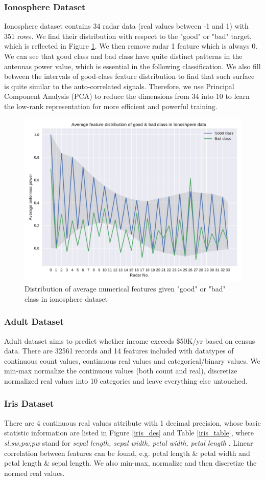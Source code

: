 \documentclass[11pt]{scrartcl}
\begin{document}
\subsubsection*{Ionosphere Dataset}
Ionosphere dataset contains 34 radar data (real values between -1 and 1) with 351 rows\cite{sigillito1989classification}. We find their distribution with respect to the "good" or "bad" target, which is reflected in Figure \ref{iono_feat}. We then remove radar 1 feature which is always 0. We can see that good class and bad class have quite distinct patterns in the antennas power value, which is essential in the following classification. We also fill between the intervals of good-class feature distribution to find that such surface is quite similar to the auto-correlated signals. Therefore, we use Principal Component Analysis (PCA) to reduce the dimensions from 34 into 10 to learn the low-rank representation for more efficient and powerful training.

\begin{figure}[t]
	\centering
	\includegraphics[width=0.6\linewidth]{fig/iono_feat_dist.pdf}
	\caption{Distribution of average numerical features given "good" or "bad" class in ionosphere dataset}
	\label{iono_feat}
\end{figure}

\subsubsection*{Adult Dataset}
Adult dataset aims to predict whether income exceeds \$50K/yr based on census data\cite{kohavi1996scaling}. There are 32561 records and 14 features included with datatypes of continuous count values, continuous real values and categorical/binary values. We min-max normalize the continuous values (both count and real),  discretize normalized real values into 10 categories and leave everything else untouched.


\subsubsection*{Iris Dataset}
There are 4 continuous real values attribute with 1 decimal precision, whose basic statistic information are listed in Figure \ref{iris_des} and Table \ref{iris_table}, where \textit{sl,sw,pw,pw} stand for \textit{sepal length, sepal width, petal width, petal length} \cite{fisher1936use}. Linear correlation between features can be found, e.g. petal length \& petal width and petal length \& sepal length. We also min-max, normalize and then discretize the normed real values.
\end{document}
